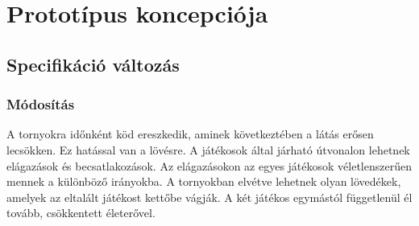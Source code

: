 %
\chapter{Prototípus koncepciója}
\setlength{\parindent}{0cm}


\thispagestyle{fancy}
\setcounter{section}{-1}
\section{Specifikáció változás}
\subsection{Módosítás}
A tornyokra időnként köd ereszkedik, aminek következtében a látás erősen lecsökken. Ez hatással van a lövésre. A játékosok által járható útvonalon lehetnek elágazások és becsatlakozások. Az elágazásokon az egyes játékosok véletlenszerűen mennek a különböző irányokba. A tornyokban elvétve lehetnek olyan lövedékek, amelyek az eltalált játékost kettőbe vágják. A két játékos egymástól függetlenül él tovább, csökkentett életerővel.

